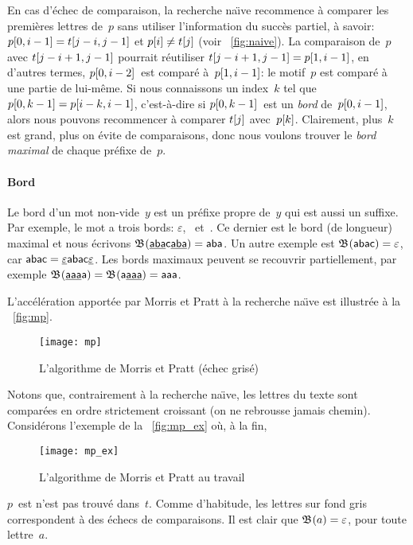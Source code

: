 En cas d'échec de comparaison, la recherche na\"{\i}ve recommence à
comparer les premières lettres de~\(p\) sans utiliser l'information du
succès partiel, à savoir: \({p}[{0,i-1}] = {t}[{j-i,j-1}]\) et
\({p}[{i}] \neq {t}[{j}]\) (voir \fig~\vref{fig:naive}). La
comparaison de~\(p\) avec \({t}[{j-i+1,j-1}]\) pourrait réutiliser
\({t}[{j-i+1,j-1}] = {p}[{1,i-1}]\), en d'autres termes,
\({p}[{0,i-2}]\)~est comparé à~\({p}[{1,i-1}]\): le motif~\(p\)
est comparé à une partie de lui-même. Si nous connaissons un
index~\(k\) tel que \({p}[{0,k-1}] = {p}[{i-k,i-1}]\),
c'est-à-dire si \({p}[{0,k-1}]\)~est un \emph{bord}
de~\({p}[{0,i-1}]\), alors nous pouvons recommencer à comparer
\({t}[{j}]\) avec~\({p}[{k}]\). Clairement, plus~\(k\) est grand,
plus on évite de comparaisons, donc nous voulons trouver le \emph{bord
  maximal} de chaque préfixe de~\(p\).

\paragraph{Bord}

Le bord d'un mot non-vide~\(y\) est un préfixe propre de~\(y\) qui est
aussi un suffixe. Par exemple, le mot  a trois bords:
\(\varepsilon\), ~et~. Ce dernier est le bord (de
longueur) maximal et nous écrivons
\(\mathfrak{B}^{}(\underline{\textsf{aba}}\textsf{c}\underline{\textsf{aba}}) =
\textsf{aba}\). Un autre exemple est \(\mathfrak{B}^{}(\textsf{abac}) =
\varepsilon\), car \(\textsf{abac} =
\underline{\varepsilon}\textsf{abac}\underline{\varepsilon}\). Les bords
maximaux peuvent se recouvrir partiellement, par exemple
\(\mathfrak{B}^{}(\underline{\textsf{aaa}}\textsf{a}) =
\mathfrak{B}^{}(\textsf{a}\underline{\textsf{aaa}}) = \textsf{aaa}\).

L'accélération apportée par Morris et Pratt à la recherche na\"{\i}ve
est illustrée à la \fig~\vref{fig:mp}.
\begin{figure}[b]
\centering
\texttt{[image: mp]}
\caption{L'algorithme de Morris et Pratt (échec grisé)}
\label{fig:mp}
\end{figure}
Notons que, contrairement à la recherche na\"{\i}ve, les lettres du
texte sont comparées en ordre strictement croissant (on ne rebrousse
jamais chemin). Considérons l'exemple de la \fig~\vref{fig:mp_ex} où,
à la fin,
\begin{figure}[t]
\centering
\texttt{[image: mp\_ex]}
\caption{L'algorithme de Morris et Pratt au travail}
\label{fig:mp_ex}
\end{figure}
\(p\)~est n'est pas trouvé dans~\(t\). Comme d'habitude, les lettres
sur fond gris correspondent à des échecs de comparaisons. Il est clair
que \(\mathfrak{B}^{}(a) = \varepsilon\), pour toute lettre~\(a\).

